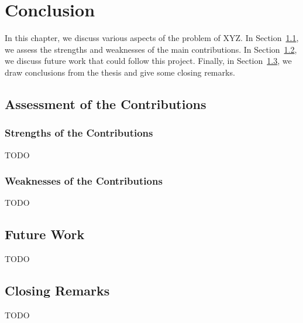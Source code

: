 \chapter{Conclusion}
\label{cha:conclusion}

In this chapter, we discuss various aspects of the problem of XYZ. In Section~\ref{sec:assessment_of_the_contributions}, we assess the strengths and weaknesses of the main contributions. In Section~\ref{sec:future_work}, we discuss future work that could follow this project. Finally, in Section~\ref{sec:closing_remarks}, we draw conclusions from the thesis and give some closing remarks.

\section{Assessment of the Contributions}
\label{sec:assessment_of_the_contributions}

\subsection{Strengths of the Contributions}
\label{sub:strengths_of_the_contributions}

TODO

\subsection{Weaknesses of the Contributions}
\label{sub:weaknesses_of_the_contributions}

TODO

\section{Future Work}
\label{sec:future_work}

TODO



\section{Closing Remarks}
\label{sec:closing_remarks}

TODO
